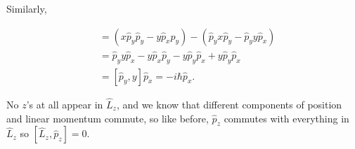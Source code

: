 Similarly,

\begin{align}
    [\hat{L}_x,\hat{p}_y] &= (x\hat{p}_y\hat{p}_y - y\hat{p}_x\hat{p}_y) - (\hat{p}_y x \hat{p}_y - \hat{p}_y y \hat{p}_x) \\
    &= \hat{p}_y y \hat{p}_x - y\hat{p}_x\hat{p}_y - y\hat{p}_y\hat{p}_x + y\hat{p}_y\hat{p}_x \\
    &= [\hat{p}_y,y]\hat{p}_x = \boxed{-i\hbar \hat{p}_x}.
\end{align}

No $z$'s at all appear in $\hat{L}_z$, and we know that different components of position and linear momentum commute, so like before, $\hat{p}_z$ commutes with everything in $\hat{L}_z$ so $\boxed{[\hat{L}_z,\hat{p}_z]=0.}$
